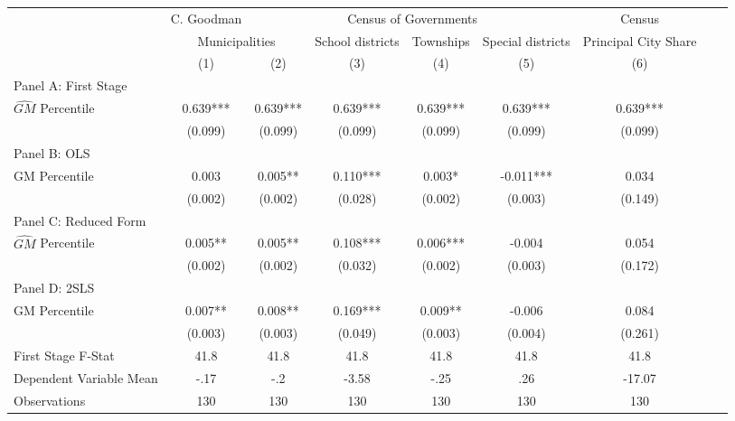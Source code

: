  \begin{tabular}{l*{8}{c}} \toprule
&\multicolumn{1}{c}{C. Goodman}&\multicolumn{4}{c}{Census of Governments}&\multicolumn{1}{c}{Census}\\\cmidrule(lr){2-2}\cmidrule(lr){3-6}\cmidrule(lr){7-7}
&\multicolumn{2}{c}{Municipalities}&\multicolumn{1}{c}{School districts}&\multicolumn{1}{c}{Townships}&\multicolumn{1}{c}{Special districts}&\multicolumn{1}{c}{Principal City Share}\\\cmidrule(lr){2-3}\cmidrule(lr){4-6}\cmidrule(lr){7-7}
&\multicolumn{1}{c}{(1)}&\multicolumn{1}{c}{(2)}&\multicolumn{1}{c}{(3)}&\multicolumn{1}{c}{(4)}&\multicolumn{1}{c}{(5)}&\multicolumn{1}{c}{(6)}\\
\cmidrule(lr){1-7}
\multicolumn{6}{l}{Panel A: First Stage}\\
\cmidrule(lr){1-7}
$\widehat{GM}$ Percentile&    0.639***&    0.639***&    0.639***&    0.639***&    0.639***&    0.639***\\
                &  (0.099)   &  (0.099)   &  (0.099)   &  (0.099)   &  (0.099)   &  (0.099)   \\
\cmidrule(lr){1-7}
\multicolumn{6}{l}{Panel B: OLS}\\
\cmidrule(lr){1-7}
GM Percentile   &    0.003   &    0.005** &    0.110***&    0.003*  &   -0.011***&    0.034   \\
                &  (0.002)   &  (0.002)   &  (0.028)   &  (0.002)   &  (0.003)   &  (0.149)   \\
\cmidrule(lr){1-7}
\multicolumn{6}{l}{Panel C: Reduced Form}\\
\cmidrule(lr){1-7}
$\widehat{GM}$ Percentile&    0.005** &    0.005** &    0.108***&    0.006***&   -0.004   &    0.054   \\
                &  (0.002)   &  (0.002)   &  (0.032)   &  (0.002)   &  (0.003)   &  (0.172)   \\
\cmidrule(lr){1-7}
\multicolumn{6}{l}{Panel D: 2SLS}\\
\cmidrule(lr){1-7}
GM Percentile   &    0.007** &    0.008** &    0.169***&    0.009** &   -0.006   &    0.084   \\
                &  (0.003)   &  (0.003)   &  (0.049)   &  (0.003)   &  (0.004)   &  (0.261)   \\
\midrule
First Stage F-Stat&     41.8   &     41.8   &     41.8   &     41.8   &     41.8   &     41.8   \\
Dependent Variable Mean&     -.17   &      -.2   &    -3.58   &     -.25   &      .26   &   -17.07   \\
Observations    &      130   &      130   &      130   &      130   &      130   &      130   \\
       \bottomrule \end{tabular}
